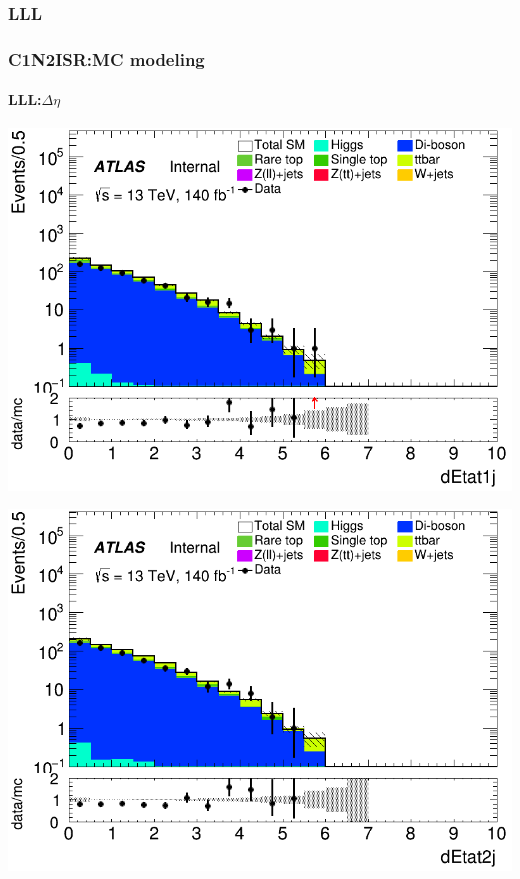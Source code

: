 \documentclass[usenames,dvipsnames]{beamer}
\begin{document}
\subsubsection{LLL}
\begin{frame}
\frametitle{C1N2ISR:MC modeling}
\framesubtitle{LLL:\quad $\Delta\eta$}
    \begin{minipage}{0.32\textwidth}
        \centering
        \includegraphics[width=\textwidth]{graphics/LLL_met/LLL_met_dEtat1j.png}
    \end{minipage}
    \hfill
    \begin{minipage}{0.32\textwidth}
        \centering
        \includegraphics[width=\textwidth]{graphics/LLL_met/LLL_met_dEtat2j.png}
    \end{minipage}
    \hfill

\end{frame}
\end{document}
